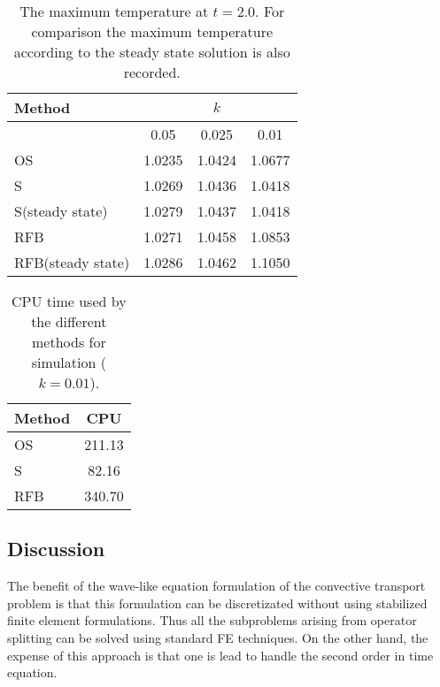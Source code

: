 \begin{table}  
\caption{The maximum temperature at $t=2.0$. For comparison 
the maximum temperature according to the steady state solution is also 
recorded.}
\label{methodvstemperature}
\begin{center}
\begin{tabular}{lccc}\hline
Method            &        &  $k$   &                \\ \hline
                  & 0.05   & 0.025  & 0.01           \\ \hline
OS                & 1.0235 & 1.0424 & 1.0677         \\
S                 & 1.0269 & 1.0436 & 1.0418         \\
S(steady state)   & 1.0279 & 1.0437 & 1.0418         \\
RFB               & 1.0271 & 1.0458 & 1.0853         \\
RFB(steady state) & 1.0286 & 1.0462 & 1.1050         \\ \hline
\end{tabular}
\end{center}
\end{table}

\begin{table} 
\caption{CPU time used by the different methods for simulation ($k=0.01$).}
\label{methodvscpu}
\begin{center}
\begin{tabular}{lc}\hline
Method            & CPU     \\ \hline
OS                & 211.13  \\
S                 & 82.16   \\
RFB               & 340.70  \\ \hline
\end{tabular}
\end{center}
\end{table}


\subsection*{Discussion}

The benefit of the wave-like equation formulation of the convective 
transport problem is that this formulation can be discretizated without
using stabilized finite element formulations. Thus all the subproblems
arising from operator splitting can be solved using standard FE
techniques. On the other hand,
the expense of this approach is that one is lead to handle the second
order in time equation. 

